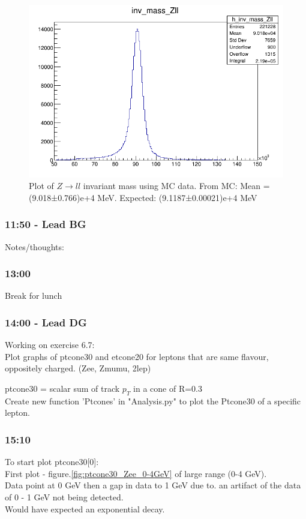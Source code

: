 \begin{figure}[h!]
    \centering
    \includegraphics[width=0.85\linewidth]{plots/11-02-2021/Zll-fast_inv-mass_50-150GeV_11-02-21_11_12}
    \caption{Plot of $Z \rightarrow ll$ invariant mass using MC data. From MC: Mean = (9.018±0.766)e+4 MeV. Expected: (9.1187±0.00021)e+4 MeV
    }\label{fig:zll_inv-mass_50-150GeV_11-02-21_11:12}
\end{figure}


\subsubsection*{\textbf{11:50} - Lead BG}

Notes/thoughts:

\subsubsection*{\textbf{13:00}}
Break for lunch

\subsubsection*{\textbf{14:00} - Lead DG}
Working on exercise 6.7:\\
Plot graphs of ptcone30 and etcone20 for leptons that are same flavour, oppositely charged. (Zee, Zmumu, 2lep)

ptcone30 = scalar sum of track $p_T$ in a cone of R=0.3\\

Create new function 'Ptcones' in "Analysis.py" to plot the Ptcone30 of a specific lepton.

\subsubsection*{\textbf{15:10}}
To start plot ptcone30[0]:
\\
First plot - figure.\ref{fig:ptcone30_Zee_0-4GeV} of large range (0-4 GeV).\\
Data point at 0 GeV then a gap in data to 1 GeV due to. an artifact of the data of 0 - 1 GeV not being detected. \\
Would have expected an exponential decay.

